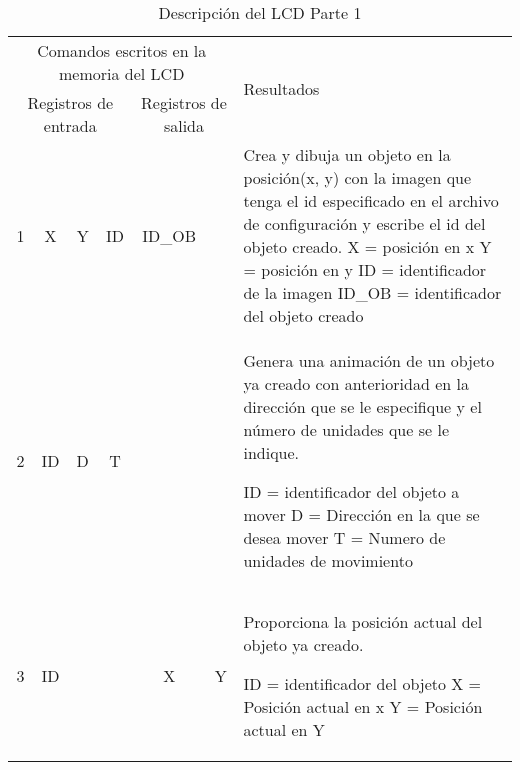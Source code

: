 \begin{table}
\begin{longtable}{|c|c|c|c|c|c|p{4 cm}|}
\multicolumn{6}{|c|}{Comandos escritos en la memoria del LCD}
&
\multirow{2}{*}{Resultados}
\\
\multicolumn{4}{|c|}{Registros de entrada} &
\multicolumn{2}{|c|}{Registros de salida} &
\\
1 & X & Y & ID & ID\_OB &  & 
Crea y dibuja un objeto en la posición(x, y) con la imagen que tenga el id especificado en el archivo de configuración y escribe el id del objeto creado.
\newline
X = posición en x\newline
Y = posición en y\newline
ID = identificador de la imagen\newline
ID\_OB = identificador del objeto creado
\\
\hline
2 & ID & D & T & &  & 

Genera una animación de un objeto ya creado con anterioridad en la dirección que se le especifique y el número de unidades que se le indique.\newline

ID = identificador del objeto a mover\newline
D = Dirección en la que se desea mover\newline
T = Numero de unidades de movimiento\newline
\\
\hline
3 & ID &  &  & X & Y & 


Proporciona la posición actual del objeto ya creado.\newline

ID = identificador del objeto\newline
X = Posición actual en x\newline
Y = Posición actual en Y
\\
\end{longtable}
\caption{\label{tab:lcd-desc-1}Descripción del LCD Parte 1}
\end{table}

